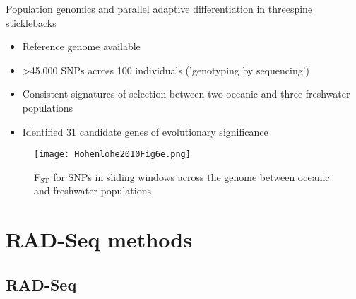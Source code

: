 \documentclass[presentation]{beamer}
\begin{document}
\begin{frame}[label=sec-1-0-4]{Population genomics and parallel adaptive differentiation in threespine sticklebacks}
\begin{itemize}
\item Reference genome available
\item >45,000 SNPs across 100 individuals ('genotyping by sequencing')
\item Consistent signatures of selection between two oceanic and three
freshwater populations
\item Identified 31 candidate genes of evolutionary significance
\end{itemize}


\begin{figure}[htb]
\centering
\texttt{[image: Hohenlohe2010Fig6e.png]}
\caption{F\(_{\text{ST}}\) for SNPs in sliding windows across the genome between oceanic and freshwater populations}
\end{figure}


\begin{center}
\tiny{\citep{Hohenlohe2010}}
\end{center}
\end{frame}




\section{RAD-Seq methods}
\label{sec-2}

\subsection{RAD-Seq}
\label{sec-2-1}
\end{document}
